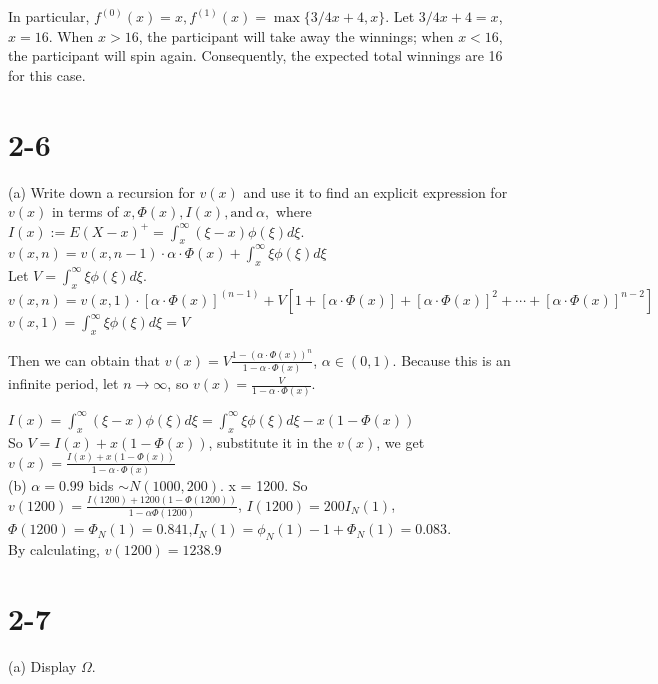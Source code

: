 \documentclass[UTF8]{article}
\begin{document}
In particular, $f^{(0)}(x) = x, f^{(1)}(x) =\max\{3/4x+4, x\}.$
Let $3/4x+4 = x$, $x = 16$. When $x>16$, the participant will take away the winnings; when $x<16$, the participant will spin again. Consequently, the expected total winnings are 16 for this case.

\section*{2-6}

(a) Write down a recursion for $v(x)$ and use it to find an explicit expression for $v(x)$ in terms of $x, \Phi(x), I(x), \text{and}~ \alpha,$ where $I(x):=E(X-x)^{+}=\int_{x}^{\infty}(\xi-x) \phi(\xi) d \xi$. \\

$v(x,n) = v(x,n-1)\cdot \alpha \cdot \Phi(x) + \int_{x}^{\infty} \xi \phi(\xi) d \xi$ \\

Let $V =\int_{x}^{\infty}\xi \phi(\xi) d \xi.$ \\

$v(x,n) = v(x,1)\cdot [\alpha \cdot \Phi(x)]^{(n-1)} + V[1+[\alpha \cdot \Phi(x)]+[\alpha \cdot \Phi(x)]^2+\cdots+[\alpha \cdot \Phi(x)]^{n-2}]$ \\

$v(x,1) = \int_{x}^{\infty}\xi \phi(\xi) d \xi = V$

Then we can obtain that $v(x) = V\frac{1-(\alpha \cdot \Phi(x))^n}{1-\alpha \cdot \Phi(x)}$, $\alpha \in (0,1)$.
Because this is an infinite period, let $n \to \infty$, so $v(x) = \frac{V}{1-\alpha \cdot \Phi(x)}$.

$I(x) = \int_{x}^{\infty}(\xi-x) \phi(\xi) d \xi = \int_{x}^{\infty} \xi \phi(\xi) d \xi - x(1-\Phi(x))$ \\

So $V = I(x) + x(1-\Phi(x))$, substitute it in the $v(x)$, we get $v(x) = \frac{I(x) + x(1-\Phi(x))}{1-\alpha \cdot \Phi(x)}$ \\

(b) $\alpha = 0.99$ bids $\sim N(1000,200)$. x = 1200.
So $v(1200) =  \frac{I(1200)+ 1200(1-\Phi(1200))}{1-\alpha \Phi(1200)}$, $I(1200) = 200I_N (1)$, $\Phi(1200) = \Phi_N(1) = 0.841$,$I_N(1) = \phi_N(1) - 1+ \Phi_N(1) = 0.083$.\\
By calculating, $v(1200) = 1238.9$

\section*{2-7}
(a) Display $\Omega$.
\end{document}
